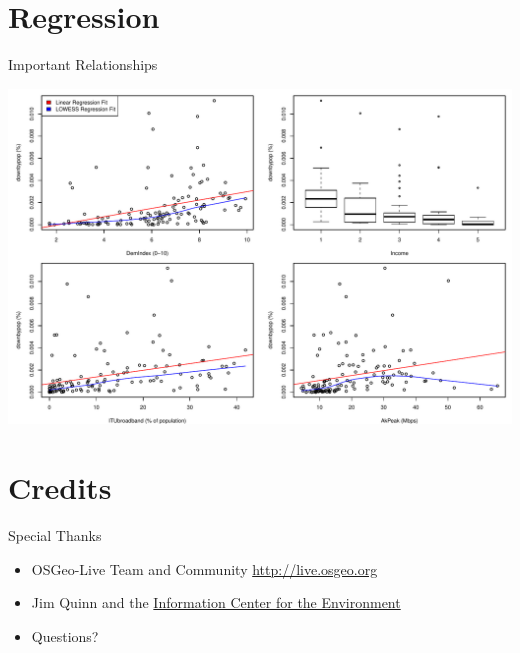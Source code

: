 \documentclass{beamer}
\begin{document}
\section{Regression}
\begin{frame}{Important Relationships}
	\begin{center}
			\includegraphics[width=1\textwidth]{ImportantVarGraph.pdf}	
	\end{center}
\end{frame}

\section{Credits}
\begin{frame}{Special Thanks}
	\begin{itemize}
		\item OSGeo-Live Team and Community \url{http://live.osgeo.org}
		\item Jim Quinn and the \href{http://ice.ucdavis.edu}{Information Center for the Environment}
		\item Questions?
		\begin{center}
		\end{center}
	\end{itemize}
\end{frame}


\end{document}

